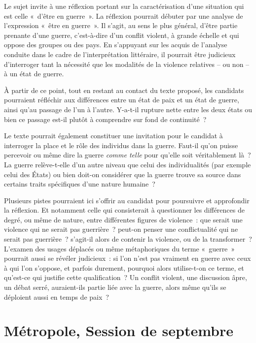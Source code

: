 {\vspace*{-12pt}Le sujet invite à une réflexion portant sur la caractérisation d'une situation qui
est celle «~d'être en guerre~». La réflexion pourrait débuter par une analyse de
l'expression «~être en guerre~». Il s'agit, au sens le plus général, d'être partie prenante
d'une guerre, c'est-à-dire d'un conflit violent, à grande échelle et qui oppose des
groupes ou des pays. En s'appuyant sur les acquis de l'analyse conduite dans le cadre
de l'interprétation littéraire, il pourrait être judicieux d'interroger tant la nécessité que
les modalités de la violence relatives – ou non – à un état de guerre.

À partir de ce point, tout en restant au contact du texte proposé, les candidats
pourraient réfléchir aux différences entre un état de paix et un état de guerre, ainsi
qu'au passage de l'un à l'autre. Y-a-t-il rupture nette entre les deux états ou bien ce
passage est-il plutôt à comprendre sur fond de continuité~?

Le texte pourrait également constituer une invitation pour le candidat à
interroger la place et le rôle des individus dans la guerre. Faut-il qu'on puisse percevoir
ou même dire la guerre \textit{comme telle} pour qu'elle soit véritablement là~? La guerre
relève-t-elle d'un autre niveau que celui des individualités (par exemple celui des États)
ou bien doit-on considérer que la guerre trouve sa source dans certains traits
spécifiques d'une nature humaine~?

Plusieurs pistes pourraient ici s'offrir au candidat pour poursuivre et approfondir
la réflexion. Et notamment celle qui consisterait à questionner les différences de degré,
ou même de nature, entre différentes figures de violence~: que serait une violence qui
ne serait pas guerrière~? peut-on penser une conflictualité qui ne serait pas guerrière~?
s'agit-il alors de contenir la violence, ou de la transformer~? L'examen des usages
déplacés ou même métaphoriques du terme «~guerre~» pourrait aussi se révéler
judicieux~: si l'on n'est pas vraiment en guerre avec ceux à qui l'on s'oppose, et parfois
durement, pourquoi alors utilise-t-on ce terme, et qu'est-ce qui justifie cette
qualification~? Un conflit violent, une discussion âpre, un débat serré, auraient-ils partie
liée avec la guerre, alors même qu'ils se déploient aussi en temps de paix~?}

\section{Métropole, Session de septembre}

